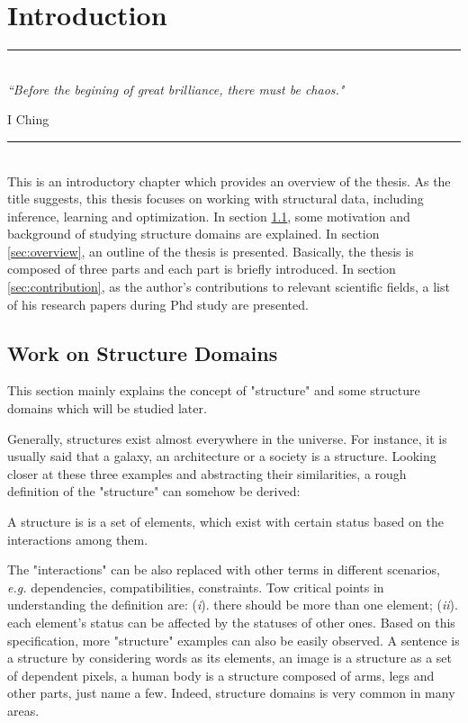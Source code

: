 
\chapter{Introduction} %
\label{Chapter1} %

\rule{\textwidth}{0.4pt} \\[0.5cm]
\textit{``Before the begining of great brilliance, there must be chaos."}

\begin{flushright}
I Ching
\end{flushright}
\rule{\textwidth}{0.4pt} 
\\
This is an introductory chapter which provides an overview of the thesis. As the title suggests, this thesis focuses on working with structural data, including 
inference, learning and optimization. In section \ref{sec:motivation}, some motivation and background of studying structure domains are explained. In section \ref{sec:overview}, 
an outline of the thesis is presented. Basically, the thesis is composed of three parts and each part is briefly introduced. In section \ref{sec:contribution}, as the author's 
contributions to relevant scientific fields, a list of his research papers during Phd study are presented.        


\section{Work on Structure Domains}
\label{sec:motivation}
This section mainly explains the concept of "structure" and some structure domains which will be studied later.                  

Generally, structures exist almost everywhere in the universe. For instance, it is usually said that a galaxy, an architecture or a society is a structure.          
Looking closer at these three examples and abstracting their similarities, a rough definition of the "structure" can somehow be derived:     
\begin{definition}
A structure is is a set of elements, which exist with certain status based on the interactions among them. 
\end{definition}

The "interactions" can be also replaced with other terms in different scenarios, \emph{e.g.} dependencies, compatibilities, constraints. 
Tow critical points in understanding the definition are: (\emph{i}). there should be more than one element; (\emph{ii}). each element's status can be affected by the statuses of other ones.  
Based on this specification, 
more "structure" 
examples can also be easily observed. A sentence is a structure by considering words as its elements, an image is a structure as a set of dependent pixels, a human body is a structure composed of 
arms, legs and other parts, just name a few. Indeed, structure domains is very common in many areas.  


